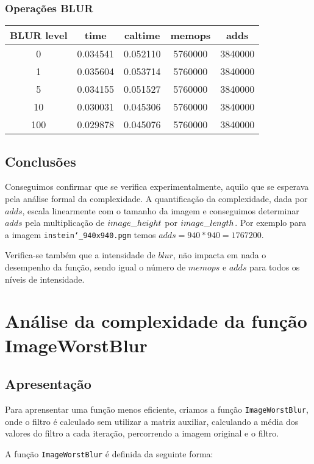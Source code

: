 \documentclass{report}
\begin{document}
\subsubsection*{Operações BLUR}
\begin{tabular}{ccccc}
\toprule
\textbf{BLUR level} & \textbf{time} & \textbf{caltime} & \textbf{memops} & \textbf{adds} \\
\midrule
0 & 0.034541 & 0.052110 & 5760000 & 3840000 \\
1 & 0.035604 & 0.053714 & 5760000 & 3840000 \\
5 & 0.034155 & 0.051527 & 5760000 & 3840000 \\
10 & 0.030031 & 0.045306 & 5760000 & 3840000 \\
100 & 0.029878 & 0.045076 & 5760000 & 3840000 \\
\bottomrule
\end{tabular}

\subsection{Conclusões}

Conseguimos confirmar que se verifica experimentalmente, aquilo que se esperava pela análise formal da complexidade. 
A quantificação da complexidade, dada por \(adds\), escala linearmente com o tamanho da imagem e 
conseguimos determinar \(adds\) pela multiplicação de \(image\char`_height\) por \(image\char`_length\). 
Por exemplo para a imagem \texttt{instein\char`_940x940.pgm} temos \texttt{$adds = 940*940 = 1767200$}.
\par
Verifica-se também que a intensidade de \(blur\), não impacta em nada o desempenho da função, sendo igual o número de \(memops\) e \(adds\) 
para todos os níveis de intensidade.


\section{Análise da complexidade da função ImageWorstBlur}

\subsection{Apresentação}
Para aprensentar uma função menos eficiente, criamos a função \texttt{ImageWorstBlur}, onde o filtro é calculado sem utilizar a matriz auxiliar,
calculando a média dos valores do filtro a cada iteração, percorrendo a imagem original e o filtro.
\par
A função \texttt{ImageWorstBlur} é definida da seguinte forma:
\end{document}
